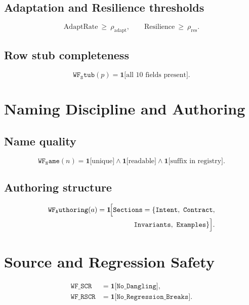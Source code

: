 \documentclass[conference]{IEEEtran}
\begin{document}
\subsection{Adaptation and Resilience thresholds}
\begin{equation}
\label{eq:adapt-resil-thr}
\mathrm{AdaptRate}\ \ge\ \rho_{\mathrm{adapt}},\qquad
\mathrm{Resilience}\ \ge\ \rho_{\mathrm{res}}.
\end{equation}

\subsection{Row stub completeness}
\begin{equation}
\label{eq:wf-stub}
\mathtt{WF_Stub}(p)=\mathbf{1}\big[\text{all 10 fields present}\big].
\end{equation}

\section{Naming Discipline and Authoring}
\subsection{Name quality}
\begin{equation}
\label{eq:wf-name}
\mathtt{WF_Name}(n)=\mathbf{1}\big[\text{unique}\big]\wedge \mathbf{1}\big[\text{readable}\big]\wedge \mathbf{1}\big[\text{suffix in registry}\big].
\end{equation}

\subsection{Authoring structure}
\begin{equation}
\label{eq:wf-authoring}
\begin{split}
\mathtt{WF_Authoring}(a)=\mathbf{1}\!\Bigl[
\mathtt{Sections}=\{\mathtt{Intent},\ \mathtt{Contract},\\[-1pt]
\mathtt{Invariants},\ \mathtt{Examples}\}
\Bigr].
\end{split}
\end{equation}

\section{Source and Regression Safety}
\begin{equation}
\label{eq:scr}
\begin{aligned}
\mathtt{WF\_SCR}  &= \mathbf{1}\big[\mathtt{No\_Dangling}\big],\\
\mathtt{WF\_RSCR} &= \mathbf{1}\big[\mathtt{No\_Regression\_Breaks}\big].
\end{aligned}
\end{equation}
\end{document}

